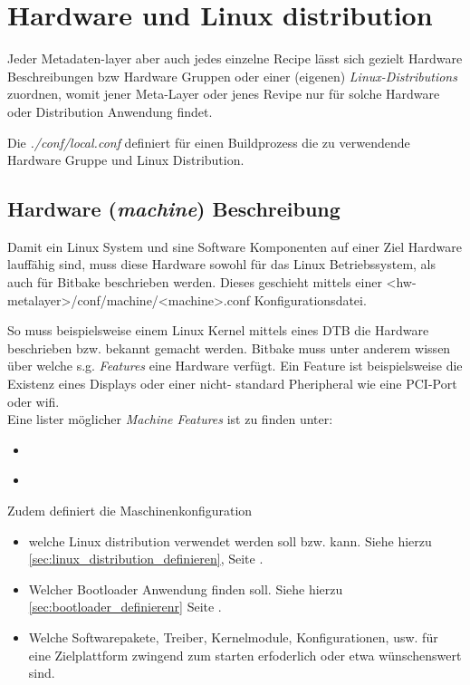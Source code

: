 

\chapter{Hardware und Linux distribution}%
\label{sec:hardware_und_linux_distribution}

Jeder Metadaten-layer aber auch jedes einzelne Recipe lässt sich gezielt
Hardware Beschreibungen bzw Hardware Gruppen oder einer (eigenen)
\textit{Linux-\glspl{Distribution}} zuordnen, womit jener Meta-Layer oder jenes
Revipe nur für solche Hardware oder Distribution Anwendung findet.

Die \textit{./conf/local.conf} definiert für einen Buildprozess die zu
verwendende Hardware Gruppe und Linux Distribution.

\section{Hardware (\textit{machine}) Beschreibung}%
\label{sec:hardware_machine_beschreibung}

Damit ein Linux System und sine Software Komponenten auf einer Ziel Hardware
lauffähig sind, muss diese Hardware sowohl für das Linux Betriebssystem, als
auch für Bitbake beschrieben werden. Dieses geschieht mittels
einer <hw-metalayer>/conf/machine/<machine>.conf Konfigurationsdatei.

So muss beispielsweise einem Linux Kernel mittels eines \acl{DTB} die Hardware
beschrieben bzw. bekannt gemacht werden. Bitbake muss unter anderem wissen
über welche s.g. \textit{\glspl{Feature}} eine Hardware verfügt.
Ein Feature ist beispielsweise die Existenz eines Displays oder  einer nicht-
standard Pheripheral wie eine PCI-Port oder wifi.  \\

Eine lister möglicher \textit{Machine Features} ist zu finden unter:
\begin{itemize}
    \item \cite[Abschn. Machine\_Features][]{Yocto:Reference_Manual}
    \item \cite[Abschn. Machine\_Features][]{Yocto:Mega_Manual}
\end{itemize}

Zudem definiert die Maschinenkonfiguration
\begin{itemize}
    \item welche Linux distribution verwendet werden soll bzw. kann. Siehe
        hierzu \ref{sec:linux_distribution_definieren}, Seite
        \pageref{sec:linux_distribution_definieren}.
    \item Welcher Bootloader Anwendung finden soll. Siehe hierzu
        \ref{sec:bootloader_definierenr} Seite
        \pageref{sec:bootloader_definieren}.
    \item Welche Softwarepakete, Treiber, Kernelmodule, Konfigurationen, usw.
        für eine Zielplattform zwingend zum starten erfoderlich oder etwa
        wünschenswert sind.
\end{itemize}

